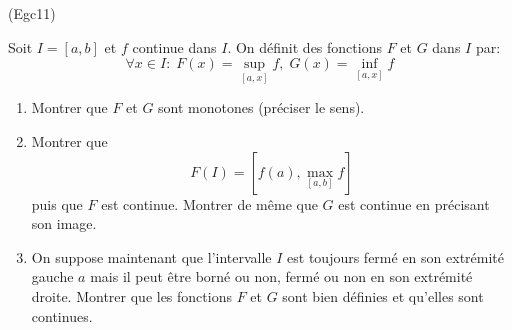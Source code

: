 \begin{tiny}(Egc11)\end{tiny}
Soit $I=[a,b]$ et $f$ continue dans $I$. On définit des fonctions $F$ et $G$ dans $I$ par:
\begin{displaymath}
 \forall x \in I : \; F(x)=\sup_{[a,x]}f,  \; G(x)=\inf_{[a,x]}f  
\end{displaymath}
\begin{enumerate}
 \item Montrer que $F$ et $G$ sont monotones (préciser le sens).
 \item Montrer que 
\begin{displaymath}
 F(I)=\left[ f(a),\max_{[a,b]}f\right] 
\end{displaymath}
 puis que $F$ est continue. Montrer de même que $G$ est continue en précisant son image.
  \item On suppose maintenant que l'intervalle $I$ est toujours fermé en son extrémité gauche $a$ mais il peut être borné ou non, fermé ou non en son extrémité droite. Montrer que les fonctions $F$ et $G$ sont bien définies et qu'elles sont continues. 
\end{enumerate}

 